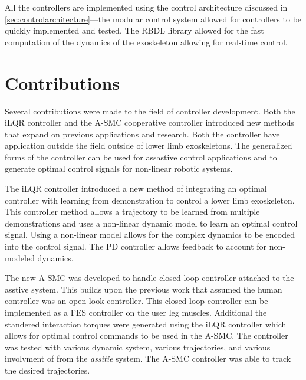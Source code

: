 All the controllers are implemented using the control architecture discussed in \autoref{sec:controlarchitecture}—the modular control system allowed for controllers to be quickly implemented and tested. The RBDL library allowed for the fast computation of the dynamics of the exoskeleton allowing for real-time control. 







\section{Contributions}

Several contributions were made to the field of controller development. Both the iLQR controller and the A-SMC cooperative controller introduced new methods that expand on previous applications and research. Both the controller have application outside the field outside of lower limb exoskeletons. The generalized forms of the controller can be used for assastive control applications and to generate optimal control signals for non-linear robotic systems. 


The iLQR controller introduced a new method of integrating an optimal controller with learning from demonstration to control a lower limb exoskeleton. This controller method allows a trajectory to be learned from multiple demonstrations and uses a non-linear dynamic model to learn an optimal control signal.  Using a non-linear model allows for the complex dynamics to be encoded into the control signal. The PD controller allows feedback to account for non-modeled dynamics. 

The new A-SMC was developed to handle closed loop controller attached to the asstive system. This builds upon the previous work that assumed the human controller was an open look controller. This closed loop controller can be implemented as a FES controller on the user leg muscles. Additional the standered interaction torques were generated using the iLQR controller which allows for optimal control commands to be used in the A-SMC. The controller was tested with various dynamic system, various trajectories, and various involvment of from the  \textit{assitie} system. The A-SMC controller was able to track the desired trajectories. 

